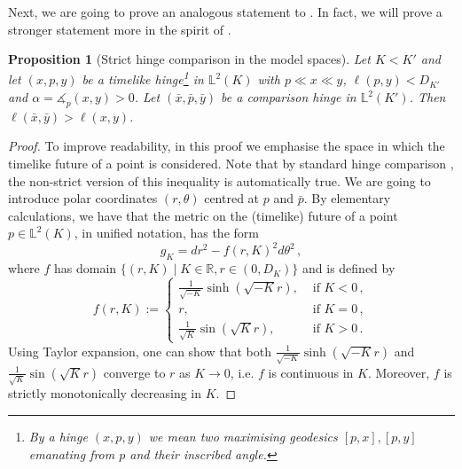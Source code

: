 \documentclass[hidelinks,12pt,a4paper]{article}
\numberwithin{equation}{section}
\theoremstyle{plain}
\newtheorem{proposition}[definition]{Proposition}
\theoremstyle{definition}
\newcommand{\R}{\mathbf R}
\newcommand{\lm}[1]{\mathbb{L}^2(#1)}
\newcommand*{\bx}{\bar{x}}
\newcommand*{\by}{\bar{y}}
\newcommand*{\bp}{\bar{p}}
\newcommand{\ma}{\ensuremath{\measuredangle}}
\begin{document}
Next, we are going to prove an analogous statement to \cite[Lemma 4.3]{BuFaWra}. In fact, we will prove a stronger statement more in the spirit of \cite[Lemma II.1.13]{BH99}.

\begin{proposition}[Strict hinge comparison in the model spaces]
\label{prop: Strict hinge comparison in the model spaces}
Let $K < K'$ and let $(x,p,y)$ be a timelike hinge\footnote{By a hinge $(x,p,y)$ we mean two maximising geodesics $[p,x], [p,y]$ emanating from $p$ and their inscribed angle.} in $\lm{K}$ with $p \ll x \ll y$, $\ell(p,y) < D_{K'}$ and $\alpha =\ma_p(x,y) > 0$. 
Let $(\bx,\bp,\by)$ be a comparison hinge in $\lm{K'}$. 
Then $\ell(\bx,\by) > \ell(x,y)$.
\end{proposition}

\begin{proof}
To improve readability, in this proof we emphasise the space in which the timelike future of a point is considered. 
Note that by standard hinge comparison \cite[Definition 3.14 \& Theorem 5.1]{BKR24}, the non-strict version of this inequality is automatically true.
We are going to introduce polar coordinates $(r,\theta)$ centred at $p$ and $\bp$. 
By elementary calculations, we have that the metric on the (timelike) future of a point $p \in \lm{K}$, in unified notation, has the form 
\begin{equation*}
g_K=dr^2 - f(r,K)^2d\theta^2 \, ,
\end{equation*}
where $f$ has domain $\{ (r,K) \mid K \in \mathbb{R}, r \in (0,D_K) \}$ and is defined by
\begin{equation*}
f(r,K):=
\begin{cases}
\frac{1}{\sqrt{-K}}\sinh(\sqrt{-K}r), & \text{ if } K<0 \, , \\
r, & \text{ if } K=0 \, , \\
\frac{1}{\sqrt{K}}\sin(\sqrt{K}r), & \text{ if } K>0 \, .
\end{cases}
\end{equation*} 
Using Taylor expansion, one can show that both $\frac{1}{\sqrt{-K}}\sinh(\sqrt{-K}r)$ and $\frac{1}{\sqrt{K}}\sin(\sqrt{K}r)$ converge to $r$ as $K \to 0$, i.e. $f$ is continuous in $K$. 
Moreover, $f$ is strictly monotonically decreasing in $K$. 


\end{proof}
\end{document}

